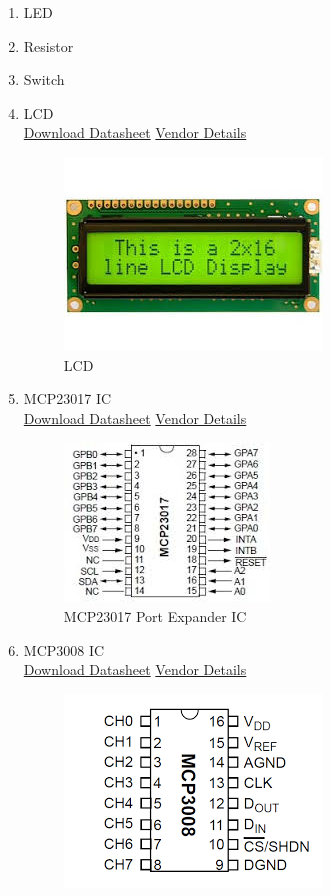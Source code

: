 \documentclass[a4paper,12pt,oneside]{book}
\begin{document}
\begin{itemize}
\begin{enumerate}
      \item LED
      \item Resistor
      \item Switch
      \item LCD   \\
      \href{www.agspecinfo.com/pdfs/J/JHD162A.pdf} {Download Datasheet}
      \href{http://www.amazon.in/JCE-16x2-LCD-Display/dp/B00OVY28M4} {Vendor Details}
      \begin{figure}[H]
        \centering
        \includegraphics[scale=0.6]{LCD}
        \caption{LCD}
      \end{figure}
      \newpage
      \item MCP23017 IC     \\
      \href{www.cdn-shop.adafruit.com/datasheets/mcp23017.pdf} {Download Datasheet}
      \href{http://www.smddevices.com/} {Vendor Details}
      \begin{figure}[H]
        \centering
        \includegraphics[scale=0.6]{MCp23017}
        \caption{MCP23017 Port Expander IC}
      \end{figure}
      \item MCP3008 IC       \\
      \href{www.cdn-shop.adafruit.com/datasheets/MCP3008.pdf} {Download Datasheet}
      \href{http://www.dnatechindia.com/MCP3008-10-Bit-ADC.html} {Vendor Details}
      \begin{figure}[H]
        \centering
        \includegraphics[scale=0.6]{Mcp3008}

\end{figure}
\end{enumerate}
\end{itemize}
\end{document}

